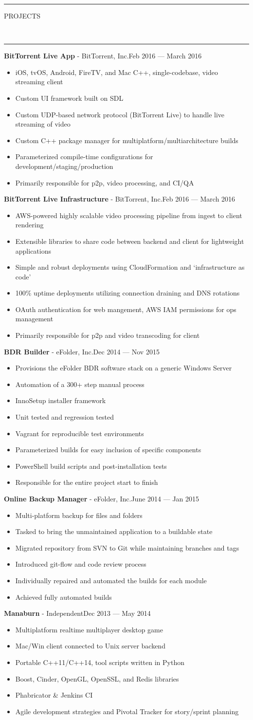 \documentclass[10pt, letterpaper, oneside]{article}
\newcommand{\HRule}[2]{\textcolor{#1}{\rule{\linewidth}{#2}}}
\newcommand{\sectiontitle}[1]{\begin{minipage}{\textwidth}\HRule{black}{0.25mm}\vspace{-10pt}\begin{center}\Large\MakeUppercase{#1}\end{center}\end{minipage}\\\HRule{light-grey}{0.15mm}\vspace{\baselineskip}}
\newenvironment{tightressection}[1]{
  \begin{minipage}{\textwidth}
  \sectiontitle{#1}}
  {\vspace{2\baselineskip}\end{minipage}}
\newcommand{\resitem}[1]{
    \vspace{2pt}
    \item \begin{flushleft} #1 \end{flushleft}
}
\newcommand{\resentryheader}[3]{
    \vspace{-5pt}
    \textbf{#1} - #2\hspace{\stretch{1}}\textcolor{light-grey}{#3}\\
}
\newenvironment{resentry}[3]{
  \begin{minipage}{\textwidth}
    \resentryheader{#1}{#2}{#3}
        \vspace{-\baselineskip}
    \begin{itemize}[noitemsep,nolistsep]
}{
    \end{itemize}
        \vspace{\baselineskip}
        \end{minipage}
}
\begin{document}
\begin{tightressection}{Projects}
  \begin{resentry}{BitTorrent Live App}{BitTorrent, Inc.}{Feb 2016 --- March 2016}
    \resitem{iOS, tvOS, Android, FireTV, and Mac C++, single-codebase, video streaming client}
    \resitem{Custom UI framework built on SDL}
    \resitem{Custom UDP-based network protocol (BitTorrent Live) to handle live streaming of video}
    \resitem{Custom C++ package manager for multiplatform/multiarchitecture builds}
    \resitem{Parameterized compile-time configurations for development/staging/production}
    \resitem{Primarily responsible for p2p, video processing, and CI/QA}
  \end{resentry}
  \begin{resentry}{BitTorrent Live Infrastructure}{BitTorrent, Inc.}{Feb 2016 --- March 2016}
    \resitem{AWS-powered highly scalable video processing pipeline from ingest to client rendering}
    \resitem{Extensible libraries to share code between backend and client for lightweight applications}
    \resitem{Simple and robust deployments using CloudFormation and {\lq}infrastructure as code{\rq}}
    \resitem{100\% uptime deployments utilizing connection draining and DNS rotations}
    \resitem{OAuth authentication for web mangement, AWS IAM permissions for ops management}
    \resitem{Primarily responsible for p2p and video transcoding for client}
  \end{resentry}
  \begin{resentry}{BDR Builder}{eFolder, Inc.}{Dec 2014 --- Nov 2015}
    \resitem{Provisions the eFolder BDR software stack on a generic Windows Server}
    \resitem{Automation of a 300+ step manual process}
    \resitem{InnoSetup installer framework}
    \resitem{Unit tested and regression tested}
    \resitem{Vagrant for reproducible test environments}
    \resitem{Parameterized builds for easy inclusion of specific components}
    \resitem{PowerShell build scripts and post-installation tests}
    \resitem{Responsible for the entire project start to finish}
  \end{resentry}
  \begin{resentry}{Online Backup Manager}{eFolder, Inc.}{June 2014 --- Jan 2015}
    \resitem{Multi-platform backup for files and folders}
    \resitem{Tasked to bring the unmaintained application to a buildable state}
    \resitem{Migrated repository from SVN to Git while maintaining branches and tags}
    \resitem{Introduced git-flow and code review process}
    \resitem{Individually repaired and automated the builds for each module}
    \resitem{Achieved fully automated builds}
  \end{resentry}
  \begin{resentry}{Manaburn}{Independent}{Dec 2013 --- May 2014}
    \resitem{Multiplatform realtime multiplayer desktop game}
    \resitem{Mac/Win client connected to Unix server backend}
    \resitem{Portable C++11/C++14, tool scripts written in Python}
    \resitem{Boost, Cinder, OpenGL, OpenSSL, and Redis libraries}
    \resitem{Phabricator \& Jenkins CI}
    \resitem{Agile development strategies and Pivotal Tracker for story/sprint planning}
  \end{resentry}
\end{tightressection}
\end{document}
